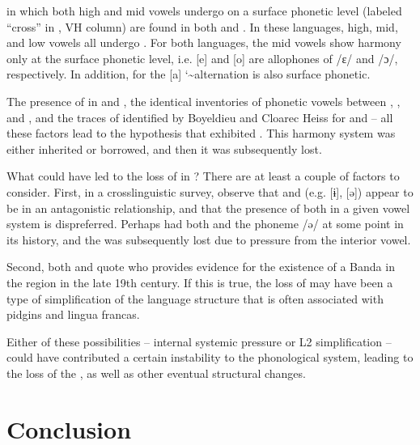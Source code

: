 \documentclass[output=paper,colorlinks,citecolor=brown]{langscibook}
\begin{document}
 in which both high and mid vowels undergo  on a surface phonetic level (labeled “cross” in , VH column) are found in both  and . In these languages, high, mid, and low vowels all undergo . For both languages, the mid vowels show harmony only at the surface phonetic level, i.e. [e] and [o] are allophones of /ɛ/ and /ɔ/, respectively. In addition, for  the [a] \char`\~ \space [ə] alternation is also surface phonetic.

The presence of  in  and , the identical inventories of phonetic vowels between , , and , and the traces of  identified by Boyeldieu and Cloarec Heiss for  and  -- all these factors lead to the hypothesis that  exhibited . This harmony system was either inherited or borrowed, and then it was subsequently lost.

What could have led to the loss of  in ? There are at least a couple of factors to consider. First, in a crosslinguistic survey, \citet{RolleEtAl2017} observe that  and  (e.g. [ɨ], [ə]) appear to be in an antagonistic relationship, and that the presence of both in a given vowel system  is dispreferred. Perhaps  had both  and the phoneme /ə/ at some point in its history, and the  was subsequently lost due to pressure from the interior vowel.

Second, both \citet{Samarin1982} and \citet{Cloarec-Heiss1995} quote \citet[205--206]{Brunache1894} who provides evidence for the existence of a Banda   in the region in the late 19th century. If this is true, the loss of  may have been a type of simplification of the language structure that is often associated with pidgins  and  lingua francas.

Either of these possibilities -- internal systemic pressure or L2 simplification -- could have contributed a certain instability to the phonological system, leading to the loss of the , as well as other eventual structural changes.

\section{Conclusion}\label{sec:olson:5}
\end{document}
